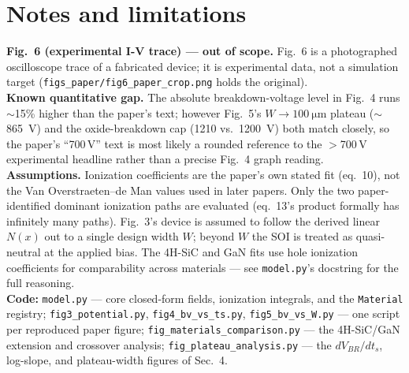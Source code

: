 \documentclass[11pt]{article}
\newcommand{\ts}{t_{s}}
\newcommand{\Wdep}{W}
\begin{document}
\section{Notes and limitations}
\textbf{Fig.~6 (experimental I-V trace) --- out of scope.} Fig.~6 is a
photographed oscilloscope trace of a fabricated device; it is experimental
data, not a simulation target (\texttt{figs\_paper/fig6\_paper\_crop.png}
holds the original).\\[4pt]
\textbf{Known quantitative gap.} The absolute breakdown-voltage level in
Fig.~4 runs $\sim$15\% higher than the paper's text; however Fig.~5's
$\Wdep\to\SI{100}{\micro\meter}$ plateau ($\sim$\SI{865}{\volt}) and the
oxide-breakdown cap (\SI{1210}{} vs.\ \SI{1200}{\volt}) both match closely, so
the paper's ``700\,V'' text is most likely a rounded reference to the
$>$700\,V experimental headline rather than a precise Fig.~4 graph
reading.\\[4pt]
\textbf{Assumptions.} Ionization coefficients are the paper's own stated fit
(eq.~10), not the Van Overstraeten--de Man values used in later papers. Only
the two paper-identified dominant ionization paths are evaluated (eq.~13's
product formally has infinitely many paths). Fig.~3's device is assumed to
follow the derived linear $N(x)$ out to a single design width $\Wdep$; beyond
$\Wdep$ the SOI is treated as quasi-neutral at the applied bias. The 4H-SiC and
GaN fits use hole ionization coefficients for comparability across
materials --- see \texttt{model.py}'s docstring for the full reasoning.\\[4pt]
\textbf{Code:} \texttt{model.py} --- core closed-form fields, ionization
integrals, and the \texttt{Material} registry; \texttt{fig3\_potential.py},
\texttt{fig4\_bv\_vs\_ts.py}, \texttt{fig5\_bv\_vs\_W.py} --- one script per
reproduced paper figure; \texttt{fig\_materials\_comparison.py} --- the
4H-SiC/GaN extension and crossover analysis; \texttt{fig\_plateau\_analysis.py}
--- the $dV_{BR}/d\ts$, log-slope, and plateau-width figures of Sec.~4.
\end{document}
